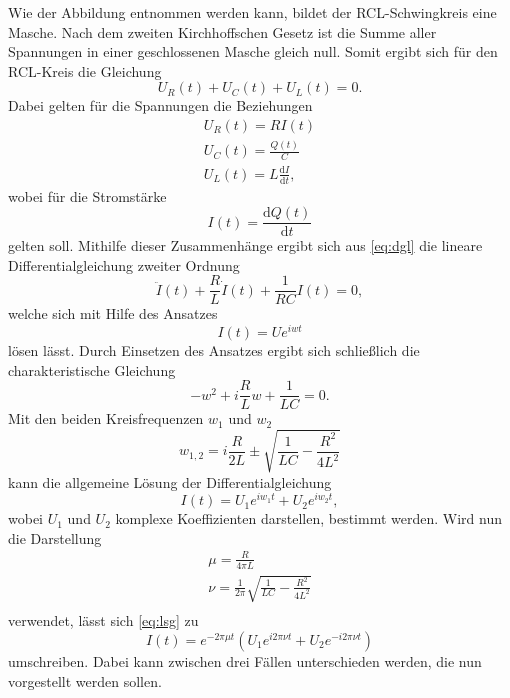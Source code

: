 \noindent Wie der Abbildung  entnommen werden kann, bildet der RCL-Schwingkreis eine Masche. Nach
dem zweiten Kirchhoffschen Gesetz ist die Summe aller Spannungen in einer geschlossenen Masche 
gleich null. Somit ergibt sich für den RCL-Kreis die Gleichung
\begin{equation}
    U_R(t)+U_C(t)+U_L(t) = 0.
    \label{eq:dgl}
\end{equation}
Dabei gelten für die Spannungen die Beziehungen
\begin{align*}
    U_R(t) = R I(t) \\ 
    U_C(t) = \frac{Q(t)}{C} \\ 
    U_L(t) = L \frac{\mathrm{d}I}{\mathrm{d}t},
\end{align*}
\noindent
wobei für die Stromstärke 
\begin{equation}
    I(t) = \frac{\mathrm{d}Q(t)}{\mathrm{d}t}
\end{equation}
\noindent
gelten soll. Mithilfe dieser Zusammenhänge ergibt sich aus \ref{eq:dgl} die lineare 
Differentialgleichung zweiter Ordnung
\begin{equation}
    \ddot{I}(t) + \frac{R}{L}\dot{I}(t) + \frac{1}{RC}I(t) = 0,
\end{equation}
\noindent
welche sich mit Hilfe des Ansatzes
\begin{equation}
    I(t) = U e^{iwt}
\end{equation}
\noindent 
lösen lässt. Durch Einsetzen des Ansatzes ergibt sich schließlich die charakteristische Gleichung
\begin{equation}
    -w^2 + i\frac{R}{L}w+\frac{1}{LC} = 0.
\end{equation}
\noindent
Mit den beiden Kreisfrequenzen $w_1$ und $w_2$ 
\begin{equation}
    w_{1,2} = i \frac{R}{2L} \pm \sqrt{\frac{1}{LC}-\frac{R^{2}}{4L^{2}}}
\end{equation}
\noindent
kann die allgemeine Lösung der Differentialgleichung 
\begin{equation}
    I(t) = U_1 e^{i w_1 t} + U_2 e^{i w_2 t},
    \label{eq:lsg}
\end{equation}
\noindent
wobei $U_1$ und $U_2$ komplexe Koeffizienten darstellen, bestimmt werden. Wird nun die 
Darstellung
\begin{align}
    \mu = \frac{R}{4\pi L} \nonumber \\
    \nu = \frac{1}{2\pi} \sqrt{\frac{1}{LC}-\frac{R^{2}}{4L^{2}}} \nonumber \\
\end{align}
\noindent
verwendet, lässt sich \ref{eq:lsg} zu
\begin{equation}
    I(t) = e^{-2\pi \mu t} \left( U_1 e^{i 2 \pi \nu t} + U_2 e^{-i 2 \pi \nu t} \right)
    \label{eq:Stromstaerke}
\end{equation}
\noindent
umschreiben. Dabei kann zwischen drei Fällen unterschieden werden, die nun vorgestellt 
werden sollen.








